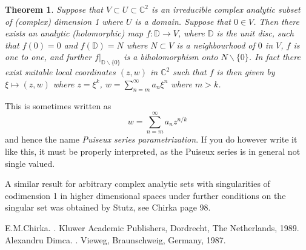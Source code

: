 \documentclass[12pt]{article}
\theoremstyle{theorem}
\newtheorem*{thm}{Theorem}
\theoremstyle{definition}
\theoremstyle{remark}
\begin{document}
\begin{thm}
Suppose that $V \subset U \subset {\mathbb{C}}^2$ is an irreducible complex analytic subset of (complex) dimension 1 where $U$ is a domain.  Suppose that $0 \in V$.  Then there exists an analytic (holomorphic) map $f \colon {\mathbb{D}} \to V$, where ${\mathbb{D}}$ is the unit disc,
such that $f(0) = 0$ and $f({\mathbb{D}}) = N$ where $N \subset V$ is a neighbourhood of $0$ in $V$, $f$ is one to one, and further $f |_{{\mathbb{D}}\backslash \{0\}}$ is a biholomorphism onto $N \backslash \{0\}$.
In fact there exist suitable local coordinates $(z,w)$ in ${\mathbb{C}}^2$ such that $f$ is then given by $\xi \mapsto (z,w)$ where $z = \xi^k$,
$w = \sum_{n=m}^\infty a_n \xi^n$ where $m > k$.
\end{thm} 

This is sometimes written as
\begin{equation*}
w = \sum_{n=m}^\infty a_n z^{n/k}
\end{equation*}
and hence the name {\em Puiseux series parametrization}.  If you do however write it like this, it must be properly interpreted, as the Puiseux series is in general not single valued.

A similar result for arbitrary complex analytic sets with singularities of codimension 1 in higher dimensional spaces under further conditions on the singular set was obtained by Stutz, see Chirka \cite{Chirka:CAS} page 98.

\begin{thebibliography}{9}
E.\@ M.\@ Chirka.
{\em {}}.
Kluwer Academic Publishers, Dordrecht, The Netherlands, 1989.
Alexandru Dimca.
{\em {}}.
Vieweg, Braunschweig, Germany, 1987.
\end{thebibliography}
\end{document}
